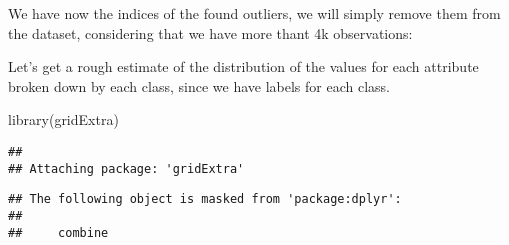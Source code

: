 \documentclass[
]{article}
\newenvironment{Shaded}{\begin{snugshade}}{\end{snugshade}}
\newcommand{\FunctionTok}[1]{\textcolor[rgb]{0.00,0.00,0.00}{#1}}
\newcommand{\NormalTok}[1]{#1}
\begin{document}
We have now the indices of the found outliers, we will simply remove
them from the dataset, considering that we have more thant 4k
observations:

Let's get a rough estimate of the distribution of the values for each
attribute broken down by each class, since we have labels for each
class.

\begin{Shaded}
\begin{Highlighting}[]
\FunctionTok{library}\NormalTok{(gridExtra)}
\end{Highlighting}
\end{Shaded}

\begin{verbatim}
## 
## Attaching package: 'gridExtra'
\end{verbatim}

\begin{verbatim}
## The following object is masked from 'package:dplyr':
## 
##     combine
\end{verbatim}
\end{document}
